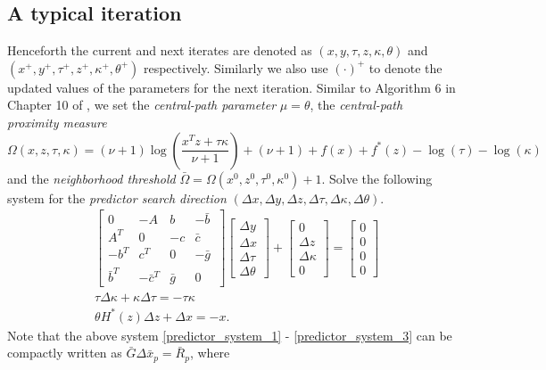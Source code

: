 \documentclass[11pt]{article}
\theoremstyle{definition}
\theoremstyle{plain}
\begin{document}
\subsection{A typical iteration}\label{A_typical_iteration}
Henceforth the current and next iterates are denoted as  $(x,y, \tau, z,\kappa, \theta)$ and  $(x^+, y^+, \tau^+, z^+,\kappa^+, \theta^+)$ respectively. Similarly we also use $(\cdot)^+$ to denote the updated values of the parameters for the next iteration. Similar to Algorithm 6 in Chapter 10 of \cite{Akle_thesis}, we set the \textit{central-path parameter} $\mu = \theta$,  the \textit{central-path proximity measure} \[\Omega(x,z,\tau,\kappa) = (\nu+1) \log\left(\frac{x^T z + \tau\kappa}{\nu+1}\right) + (\nu+1)+ f(x)+f^*(z) - \log(\tau) - \log(\kappa)\] 
and the \textit{neighborhood threshold} $\bar{\Omega} = \Omega(x^0,z^0,\tau^0,\kappa^0)+1$. 
Solve the following system for the \textit{predictor search direction} $(\Delta x, \Delta y, \Delta z, \Delta \tau, \Delta \kappa, \Delta \theta)$.
\begin{align}
& \begin{bmatrix}
0 & -A & b & -\bar b\ \\ 
A^T & 0 & -c & \bar c \\
-b^T & c^T& 0 & -\bar g \\
\bar b^T & -\bar c^T & \bar g & 0
\end{bmatrix}
\begin{bmatrix}
\Delta y \\ \Delta x \\ \Delta \tau \\ \Delta \theta
\end{bmatrix} + 
\begin{bmatrix}
0 \\ \Delta z \\ \Delta \kappa \\ 0 
\end{bmatrix} = \begin{bmatrix}
0 \\0\\0\\0
\end{bmatrix} \label{predictor_system_1} \\[1ex]
& \tau \Delta \kappa + \kappa \Delta \tau = - \tau \kappa \label{predictor_system_2} \\[1ex]
& \theta H^*(z)\Delta z + \Delta x = -x. \label{predictor_system_3}
\end{align}
Note that the above system \eqref{predictor_system_1} - \eqref{predictor_system_3} can be compactly written as $\bar G \Delta \bar x_p = \bar R_p$, where
\end{document}
